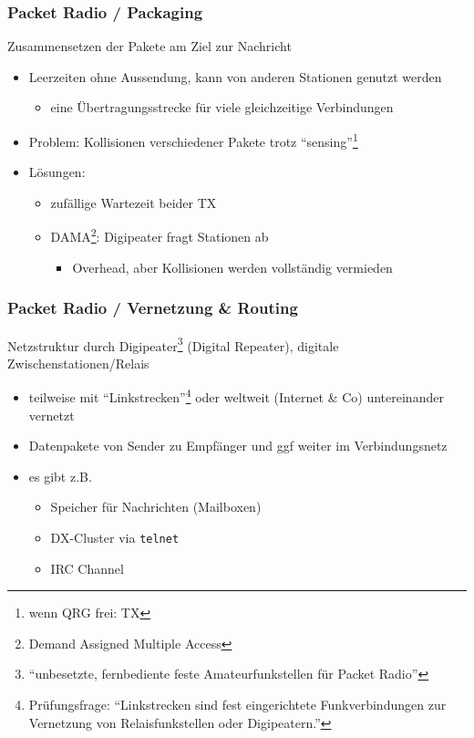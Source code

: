 \begin{frame}
  \frametitle{Packet Radio / Packaging}

  Zusammensetzen der Pakete am Ziel zur Nachricht \\[1em]

  \begin{itemize}
    \item Leerzeiten ohne Aussendung, kann von anderen Stationen genutzt werden
      \begin{itemize}
        \item eine Übertragungsstrecke für viele gleichzeitige Verbindungen
      \end{itemize}
    \item Problem: Kollisionen verschiedener Pakete trotz
      ``sensing''\footnote{wenn QRG frei: TX}
    \item Lösungen:
      \begin{itemize}
        \item zufällige Wartezeit beider TX
        \item DAMA\footnote{Demand Assigned Multiple Access}: Digipeater fragt Stationen ab
          \begin{itemize}
            \item Overhead, aber Kollisionen werden vollständig vermieden
          \end{itemize}
      \end{itemize}
  \end{itemize}

\end{frame}

\begin{frame}
  \frametitle{Packet Radio / Vernetzung \& Routing}

  Netzstruktur durch Digipeater\footnote{``unbesetzte, fernbediente feste
  Amateurfunkstellen für Packet Radio''} (Digital Repeater), digitale
  Zwischenstationen/Relais

  \begin{itemize}
    \item teilweise mit ``Linkstrecken''\footnote{Prüfungsfrage:
      ``Linkstrecken sind fest eingerichtete Funkverbindungen zur
      Vernetzung von Relaisfunkstellen oder Digipeatern.''} oder
      weltweit (Internet \& Co) untereinander vernetzt
    \item Datenpakete von Sender zu Empfänger und ggf weiter im Verbindungsnetz
    \item es gibt z.B.
      \begin{itemize}
        \item Speicher für Nachrichten (Mailboxen)
        \item DX-Cluster via \texttt{telnet}
        \item IRC Channel
      \end{itemize}
  \end{itemize}

\end{frame}

